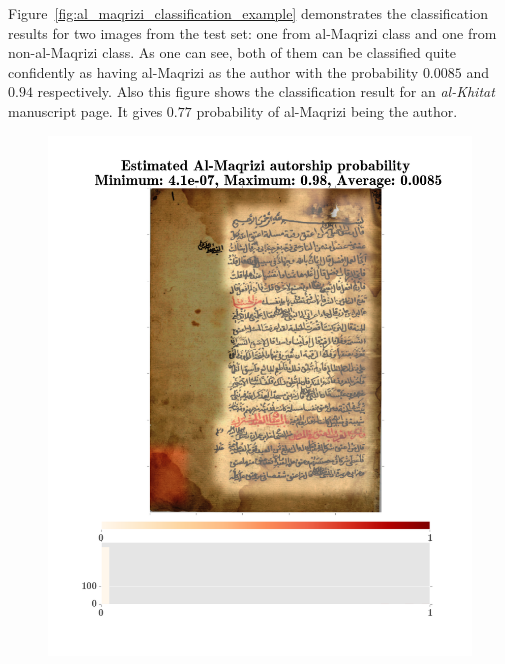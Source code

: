 \documentclass[conference,a4paper,twocolumn]{IEEEtran}
\begin{document}
Figure~\ref{fig:al_maqrizi_classification_example} demonstrates the classification results for two images from the test set: one from al-Maqrizi class and one from non-al-Maqrizi class. As one can see, both of them can be classified quite confidently as having al-Maqrizi as the author with the probability $0.0085$ and $0.94$ respectively. Also this figure shows the classification result for an {\it al-Khitat} manuscript page. It gives $0.77$ probability of al-Maqrizi being the author.

\begin{figure}
\centering
\begin{minipage}{.48\linewidth}
	\centering
  \includegraphics[width=0.9\linewidth]{figures/not_al_maqrizi_image_classification_example.png}
\end{minipage}
\hspace{.01\linewidth}
\begin{minipage}{.48\linewidth}
	\centering

\end{minipage}
\end{figure}
\end{document}
